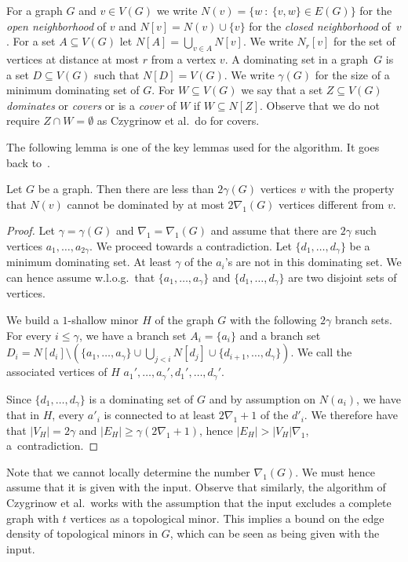 For a graph $G$ and $v\in V(G)$ we write $N(v)=\{w~:~\{v,w\}\in E(G)\}$
for the \emph{open neighborhood} of $v$ and $N[v]=N(v)\cup\{v\}$ for
the \emph{closed neighborhood} of~$v$. For a set $A\subseteq V(G)$ let
$N[A]=\bigcup_{v\in A}N[v]$. We write $N_r[v]$ for the set
of vertices at distance at most $r$ from a vertex $v$.
A dominating set in a graph~$G$ is a set
$D\subseteq V(G)$ such that $N[D]=V(G)$. We write $\gamma(G)$ for
the size of a minimum dominating set of $G$. For $W\subseteq V(G)$
we say that a set $Z\subseteq V(G)$ \emph{dominates} or \emph{covers} or
is a \emph{cover} of $W$ if $W\subseteq N[Z]$.
Observe that we do not
require $Z\cap W=\emptyset$ as Czygrinow et al.\ do for covers.

\smallskip
The following lemma is one of the key lemmas used for the algorithm. It goes back to~\cite{lenzen2013distributed}.

\begin{lemma}\label{lem:neighborhood-dom1}
Let $G$ be a graph. Then there are less than $2\gamma(G)$ vertices $v$ with the property that $N(v)$ cannot be dominated by at most $2\nabla_1(G)$ vertices different from $v$.
\end{lemma}
\begin{proof}
Let $\gamma=\gamma(G)$ and $\nabla_1=\nabla_1(G)$ and assume that there are $2\gamma$ such vertices $a_1,\ldots,a_{2\gamma}$. We proceed towards a contradiction.
  Let $\{d_1,\ldots,d_\gamma\}$ be a minimum dominating set. At least $\gamma$ of the $a_i$'s are not in this dominating set. We can hence assume w.l.o.g.~that $\{a_1,\ldots,a_{\gamma}\}$ and $\{d_1,\ldots,d_\gamma\}$ are two disjoint sets of vertices.

We build a $1$-shallow minor $H$ of the graph $G$ with the following $2\gamma$ branch sets. For every $i\le \gamma$, we have a branch set
$A_i=\{a_i\}$ and a branch set $D_i=N[d_i]\setminus (\{a_1,\ldots, a_\gamma\}\cup \bigcup_{j<i}N[d_j] \cup \{d_{i+1},\ldots, d_\gamma\})$.
We call the associated vertices of $H$ $a_1',\ldots, a_\gamma',d_1',\ldots,
d_\gamma'$.

Since $\{d_1,\ldots, d_\gamma\}$ is a dominating set of $G$ and by assumption on $N(a_i)$, we have that in $H$, every $a'_i$ is connected to at least $2\nabla_1+1$ of the $d'_i$.
  We therefore have that $|V_H|=2\gamma$ and $|E_H| \ge \gamma(2\nabla_1+1)$, hence $|E_H|> |V_H|\nabla_1$, a~contradiction.
\end{proof}

Note that we cannot locally determine the number $\nabla_1(G)$.
We must hence assume that it is given with the input. Observe that
similarly, the algorithm of Czygrinow et al.\ works with the assumption
that the input excludes a complete graph with $t$ vertices as a topological
minor. This implies a bound on the edge density of topological minors
in $G$, which can be seen as being given with the input.

